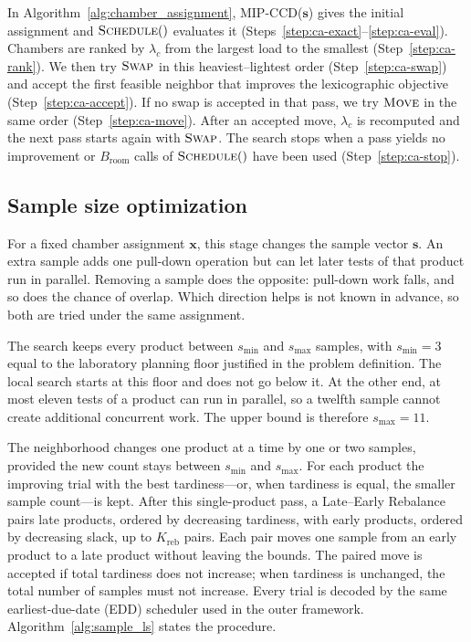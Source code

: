 \documentclass[11pt]{article}
\begin{document}
In Algorithm~\ref{alg:chamber_assignment}, MIP-CCD(\(\mathbf{s}\)) gives the initial assignment and \(\textsc{Schedule}()\) evaluates it (Steps~\ref{step:ca-exact}--\ref{step:ca-eval}). Chambers are ranked by \(\lambda_c\) from the largest load to the smallest (Step~\ref{step:ca-rank}). We then try \(\textsc{Swap}\) in this heaviest--lightest order (Step~\ref{step:ca-swap}) and accept the first feasible neighbor that improves the lexicographic objective (Step~\ref{step:ca-accept}). If no swap is accepted in that pass, we try \(\textsc{Move}\) in the same order (Step~\ref{step:ca-move}). After an accepted move, \(\lambda_c\) is recomputed and the next pass starts again with \(\textsc{Swap}\). The search stops when a pass yields no improvement or \(B_{\mathrm{room}}\) calls of \(\textsc{Schedule}()\) have been used (Step~\ref{step:ca-stop}).

\subsection{Sample size optimization}
\label{subsec:sample_optimization}
\label{subsec:sample_size_optimization}

For a fixed chamber assignment \(\mathbf{x}\), this stage changes the
sample vector \(\mathbf{s}\).
An extra sample adds one pull-down operation but can let later tests
of that product run in parallel.
Removing a sample does the opposite: pull-down work falls, and so
does the chance of overlap.
Which direction helps is not known in advance, so both are tried
under the same assignment.

The search keeps every product between \(s_{\min}\) and \(s_{\max}\)
samples, with \(s_{\min}=3\) equal to the laboratory planning floor
justified in the problem definition.
The local search starts at this floor and does not go below it.
At the other end, at most eleven tests of a product can run in
parallel, so a twelfth sample cannot create additional concurrent
work.
The upper bound is therefore \(s_{\max}=11\).

The neighborhood changes one product at a time by one or two
samples, provided the new count stays between \(s_{\min}\) and
\(s_{\max}\).
For each product the improving trial with the best tardiness---or,
when tardiness is equal, the smaller sample count---is kept.
After this single-product pass, a Late--Early Rebalance pairs late
products, ordered by decreasing tardiness, with early products,
ordered by decreasing slack, up to \(K_{\mathrm{reb}}\) pairs.
Each pair moves one sample from an early product to a late product
without leaving the bounds.
The paired move is accepted if total tardiness does not increase;
when tardiness is unchanged, the total number of samples must not
increase.
Every trial is decoded by the same earliest-due-date (EDD)
scheduler used in the outer framework.
Algorithm~\ref{alg:sample_ls} states the procedure.
\end{document}
